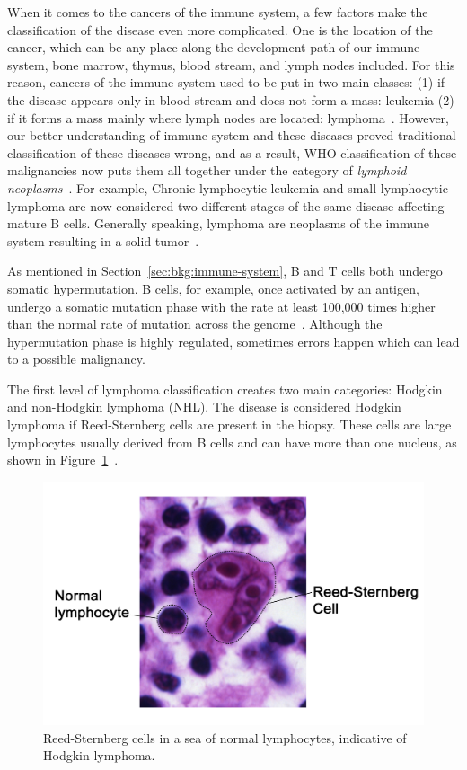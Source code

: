 When it comes to the cancers of the immune system, a few factors make the classification of the disease even more complicated. One is the location of the cancer, which can be any place along the development path of our immune system, bone marrow, thymus, blood stream, and lymph nodes included. For this reason, cancers of the immune system used to be put in two main classes: (1) if the disease appears only in blood stream and does not form a mass: leukemia (2) if it forms a mass mainly where lymph nodes are located: lymphoma~\cite{swerdlow20162016, younes2016handbook}. However, our better understanding of immune system and these diseases proved traditional classification of these diseases wrong, and as a result, WHO classification of these malignancies now puts them all together under the category of \emph{lymphoid neoplasms}~\cite{norris2008classification, swerdlow20162016}. For example, Chronic lymphocytic leukemia and small lymphocytic lymphoma are now considered two different stages of the same disease affecting mature B cells. Generally speaking, lymphoma are neoplasms of the immune system resulting in a solid tumor~\cite[Ch. 1]{younes2016handbook}.

As mentioned in Section~\ref{sec:bkg:immune-system}, B and T cells both undergo somatic hypermutation. B cells, for example, once activated by an antigen, undergo a somatic mutation phase with the rate at least 100,000 times higher than the normal rate of mutation across the genome~\cite{mendelsohn2014molecular}. Although the hypermutation phase is highly regulated, sometimes errors happen which can lead to a possible malignancy.

The first level of lymphoma classification creates two main categories: Hodgkin and non-Hodgkin lymphoma (NHL). The disease is considered Hodgkin lymphoma if Reed-Sternberg cells are present in the biopsy. These cells are large lymphocytes usually derived from B cells and can have more than one nucleus, as shown in Figure~\ref{fig:bkg:rs-cell}~\cite{sternberg1898eigenartige}.

\begin{figure}[!ht]
  \centering
  \includegraphics[width=.8\textwidth]{figs/background/Reed-Sternberg_lymphocyte_nci-vol-7172-300}
  \caption{Reed-Sternberg cells in a sea of normal lymphocytes, indicative of Hodgkin lymphoma.}
  \label{fig:bkg:rs-cell}
\end{figure}

